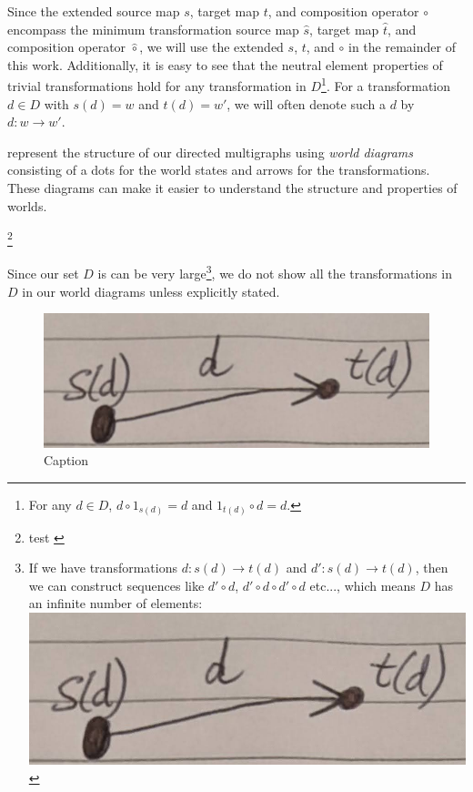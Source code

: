Since the extended source map $s$, target map $t$, and composition operator $\circ$ encompass the minimum transformation source map $\hat{s}$, target map $\hat{t}$, and composition operator $\hat{\circ}$, we will use the extended $s$, $t$, and $\circ$ in the remainder of this work.
Additionally, it is easy to see that the neutral element properties of trivial transformations hold for any transformation in $D$\footnote{For any $d \in D$, $d \circ 1_{s(d)} = d$ and $1_{t(d)} \circ d = d$.}.
For a transformation $d \in D$ with $s(d) = w$ and $t(d) = w'$, we will often denote such a $d$ by $d: w \to w'$.




 represent the structure of our directed multigraphs using \emph{world diagrams} consisting of a dots for the world states and arrows for the transformations.
These diagrams can make it easier to understand the structure and properties of worlds.


\autocite{barr1990category}\footnote{test 
\autocite{barr1990category}
}

Since our set $D$ is can be very large\footnote{
If we have transformations $d: s(d) \to t(d)$ and $d': s(d) \to t(d)$, then we can construct sequences like $d' \circ d$, $d' \circ d \circ d' \circ d$ etc..., which means $D$ has an infinite number of elements:
\includegraphics[width=0.5\linewidth]{2MathematicalFramework/InitialFramework/Images/transformation.jpg}


}, we do not show all the transformations in $D$ in our world diagrams unless explicitly stated.


\begin{figure}
    \centering
    \includegraphics[width=0.5\linewidth]{2MathematicalFramework/InitialFramework/Images/transformation.jpg}
    \caption{Caption}
    \label{fig:transformation}
\end{figure}

